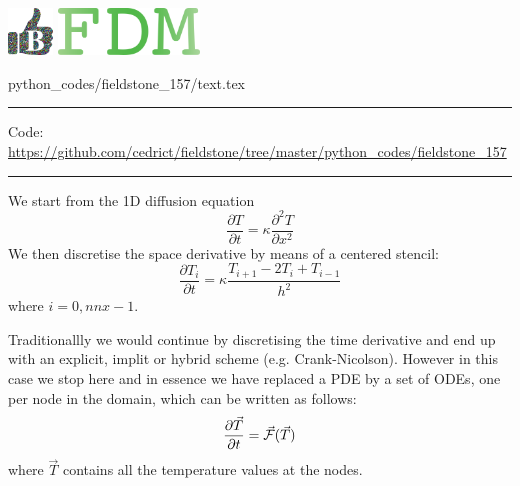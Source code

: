 \noindent
\includegraphics[height=1.25cm]{images/pictograms/benchmark}
\includegraphics[height=1.25cm]{images/pictograms/FDM}


\begin{flushright} {\tiny {\color{gray} python\_codes/fieldstone\_157/text.tex}} \end{flushright}

%

\par\noindent\rule{\textwidth}{0.4pt}

\begin{center}
\inpython
{\small Code: \url{https://github.com/cedrict/fieldstone/tree/master/python_codes/fieldstone_157}}
\end{center}

\par\noindent\rule{\textwidth}{0.4pt}




We start from the 1D diffusion equation
\[
\frac{\partial T}{\partial t} = \kappa \frac{\partial^2 T}{\partial x^2}
\]
We then discretise the space derivative by means of a centered stencil:
\[
\frac{\partial T_i}{\partial t} = \kappa \frac{T_{i+1}-2T_i+T_{i-1}}{h^2}
\]
where $i=0,nnx-1$.

Traditionallly we would continue by discretising the time derivative and 
end up with an explicit, implit or hybrid scheme (e.g. Crank-Nicolson). 
However in this case we stop here and in essence we have replaced a PDE by 
a set of ODEs, one per node in the domain,
which can be written as follows:
\[
\frac{\partial \vec{T}}{\partial t} = \vec{\cal F}(\vec{T}) 
\] 
where $\vec{T}$ contains all the temperature values at the nodes.

